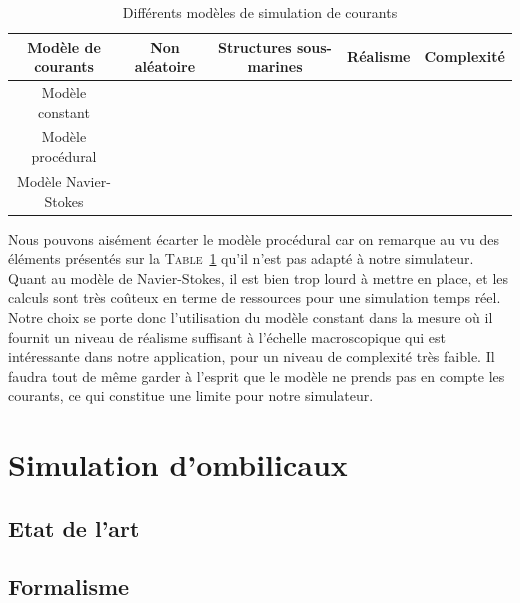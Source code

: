				\begin{table}[ht]
					\centering
					\begin{adjustbox}{max width=\textwidth}
						\begin{tabular}{|c|c|c|c|c|}
							\hline
							\textbf{Modèle de courants} & \textbf{Non aléatoire} & \textbf{Structures sous-marines} & \textbf{Réalisme} & \textbf{Complexité} \\
							\hline
							Modèle constant & \cmark & \xmark & \pmark \pmark & \pmark\\
							\hline
							Modèle procédural & \xmark & \xmark & \pmark & \pmark \pmark \\
							\hline
							Modèle Navier-Stokes & \cmark & \cmark & \pmark \pmark \pmark & \pmark \pmark \pmark \\
							\hline
						\end{tabular}
					\end{adjustbox}
					\caption{Différents modèles de simulation de courants}
					\label{table:courants}
				\end{table}

				Nous pouvons aisément écarter le modèle procédural car on remarque au vu des éléments présentés sur la \textsc{Table}~\ref{table:courants} qu'il n'est pas adapté à notre simulateur. Quant au modèle de Navier-Stokes, il est bien trop lourd à mettre en place, et les calculs sont très coûteux en terme de ressources pour une simulation temps réel. Notre choix se porte donc l'utilisation du modèle constant dans la mesure où il fournit un niveau de réalisme suffisant à l'échelle macroscopique qui est intéressante dans notre application, pour un niveau de complexité très faible. Il faudra tout de même garder à l'esprit que le modèle ne prends pas en compte les courants, ce qui constitue une limite pour notre simulateur.

		\section{Simulation d'ombilicaux}

			\subsection{Etat de l'art}

			\subsection{Formalisme}

